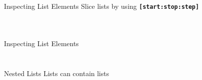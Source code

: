        \begin{frame}{Inspecting List Elements}
            Slice lists by using \texttt{\textbf{[start:stop:step]}}
            \begin{columns}
                \begin{column}{0.5\textwidth}
                \inputminted[frame=single,framesep=2pt]{python3}{code-examples/slicing.py} 
                \end{column}
               \pause 
                \begin{column}{0.5\textwidth}
                 \inputminted[frame=single,framesep=2pt]{python3}{code-examples/slicing2.py}
                \end{column} 
             \end{columns}
        \end{frame}
        \begin{frame}{Inspecting List Elements}
            \inputminted[frame=single,framesep=2pt]{python3}{code-examples/slicing3.py}
            \pause 
            \inputminted[frame=single,framesep=2pt]{python3}{code-examples/slicing4.py}
        \end{frame}
        \begin{frame}{Nested Lists}
            Lists can contain lists
            \bigskip
            \bigskip
            \inputminted[frame=single,framesep=2pt]{python3}{code-examples/nestedlists.py}
        \end{frame}

